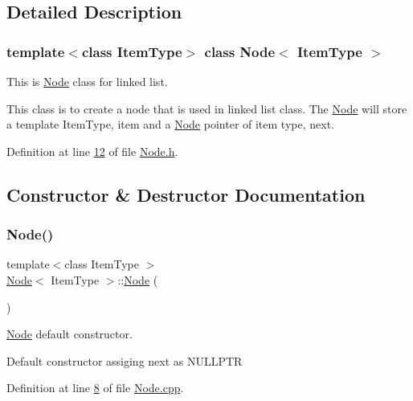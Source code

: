 \subsection{Detailed Description}
\subsubsection*{template$<$class Item\+Type$>$\newline
class Node$<$ Item\+Type $>$}

This is \hyperlink{classNode}{Node} class for linked list. 

This class is to create a node that is used in linked list class. The \hyperlink{classNode}{Node} will store a template Item\+Type, item and a \hyperlink{classNode}{Node} pointer of item type, next. 

Definition at line \hyperlink{Node_8h_source_l00012}{12} of file \hyperlink{Node_8h_source}{Node.\+h}.



\subsection{Constructor \& Destructor Documentation}
\mbox{\label{classNode_a627e94f4fba0e73c546e0fb2a7266f36}} 
\subsubsection{\texorpdfstring{Node()}{Node()}\hspace{0.1cm}{\footnotesize\ttfamily [1/3]}}
{\footnotesize\ttfamily template$<$class Item\+Type $>$ \\
\hyperlink{classNode}{Node}$<$ Item\+Type $>$\+::\hyperlink{classNode}{Node} (\begin{DoxyParamCaption}{ }\end{DoxyParamCaption})}



\hyperlink{classNode}{Node} default constructor. 

Default constructor assiging next as N\+U\+L\+L\+P\+TR 

Definition at line \hyperlink{Node_8cpp_source_l00008}{8} of file \hyperlink{Node_8cpp_source}{Node.\+cpp}.

\mbox{\label{classNode_a0288598fcb0244739ce95099c26250ae}} 
